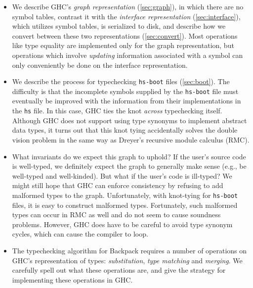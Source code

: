 \begin{itemize}
    \item We describe GHC's \emph{graph representation} (\cref{sec:graph}), in
    which there are no symbol tables, contrast it with
    the \emph{interface representation} (\cref{sec:interface}), which utilizes symbol
    tables, is serialized to disk, and describe how we convert
    between these two representations (\cref{sec:convert}).  Most operations like type
    equality are implemented only for the graph representation, but
    operations which involve \emph{updating} information associated with
    a symbol can only conveniently be done on the interface
    representation.

    \item We describe the process for typechecking
    \verb|hs-boot| files (\cref{sec:boot}). The
    difficulty is that the incomplete symbols supplied
    by the \verb|hs-boot| file must eventually be improved
    with the information from their implementations in the
    \verb|hs| file.  In this case, GHC ties the knot \emph{across}
    typechecking itself.  Although GHC does not support
    using type synonyms to implement abstract data types, it turns out that
    this knot tying accidentally solves the double vision
    problem in the same way as Dreyer's recursive module
    calculus (RMC).

    \item What invariants do we expect this graph to uphold?
    If the user's source code is well-typed, we definitely expect
    the graph to generally make sense (e.g., be well-typed and
    well-kinded).  But what if the user's code is ill-typed?  We
    might still hope that GHC can enforce consistency by refusing
    to add malformed types to the graph.  Unfortunately, with
    knot-tying for \verb|hs-boot| files, it is easy to construct
    malformed types.  Fortunately, such malformed types can occur in RMC
    as well and do not seem to cause soundness problems.  However, GHC
    does have to be careful to avoid type synonym cycles, which can
    cause the compiler to loop.

    \item The typechecking algorithm for Backpack requires
    a number of operations on GHC's representation of types:
    \emph{substitution}, \emph{type matching} and \emph{merging}.
    We carefully spell out what these operations are, and give
    the strategy for implementing these operations in GHC\@.
\end{itemize}

